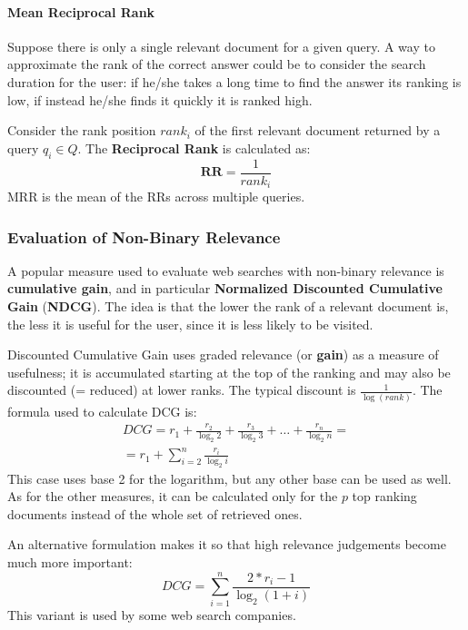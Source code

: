 \paragraph{Mean Reciprocal Rank}

Suppose there is only a single relevant document for a given query. A way to approximate the rank of the correct answer could be to consider the search duration for the user: if he/she takes a long time to find the answer its ranking is low, if instead he/she finds it quickly it is ranked high.

Consider the rank position $\textit{rank}_i$ of the first relevant document returned by a query $q_i \in Q$. The \textbf{Reciprocal Rank} is calculated as:
\begin{equation*}
    \textbf{RR} = \frac{1}{\textit{rank}_i}
\end{equation*}
MRR is the mean of the RRs across multiple queries.

\subsubsection{Evaluation of Non-Binary Relevance}

A popular measure used to evaluate web searches with non-binary relevance is \textbf{cumulative gain}, and in particular \textbf{Normalized Discounted Cumulative Gain} (\textbf{NDCG}). The idea is that the lower the rank of a relevant document is, the less it is useful for the user, since it is less likely to be visited.

Discounted Cumulative Gain uses graded relevance (or \textbf{gain}) as a measure of usefulness; it is accumulated starting at the top of the ranking and may also be discounted (= reduced) at lower ranks. The typical discount is $\frac{1}{\log(\textit{rank})}$. The formula used to calculate DCG is:
\begin{gather*}
    \textit{DCG} = r_1 + \frac{r_2}{\log_2 2} + \frac{r_3}{\log_2 3} + \dots + \frac{r_n}{\log_2 n} = \\
    = r_1 + \sum_{i=2}^n \frac{r_i}{\log_2 i}
\end{gather*}
This case uses base 2 for the logarithm, but any other base can be used as well. As for the other measures, it can be calculated only for the $p$ top ranking documents instead of the whole set of retrieved ones.

An alternative formulation makes it so that high relevance judgements become much more important:
\begin{equation*}
    DCG = \sum_{i=1}^n \frac{2*{r_i} - 1}{\log_2(1+i)}
\end{equation*}
This variant is used by some web search companies.

